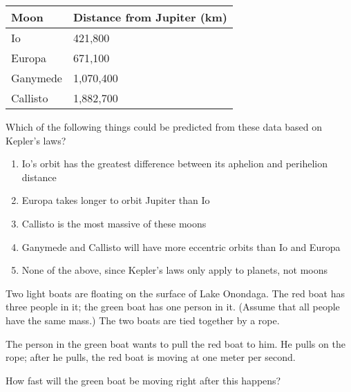 \documentclass[12pt]{article}
\def\BS{\bigskip}
\begin{document}
\begin{enumerate}
\begin{minipage}{\textwidth}
{\begin{center}
\begin{tabular}{|l|l|}
\hline
Moon  & Distance from Jupiter (km) \\ \hline
Io      & 421,800              \\ \hline
Europa  & 671,100              \\ \hline
Ganymede& 1,070,400           \\ \hline
Callisto& 1,882,700           \\ \hline
\end{tabular}
\end{center}

\bigskip

Which of the following things could be predicted from these data based on Kepler's laws?

\begin{enumerate}[label=(\Alph*)]
\setlength\itemsep{0.0em}
\item{ Io's orbit has the greatest difference between its aphelion and perihelion distance }
\item{ Europa takes longer to orbit Jupiter than Io }
\item{ Callisto is the most massive of these moons }
\item{ Ganymede and Callisto will have more eccentric orbits than Io and Europa }
\item{ None of the above, since Kepler's laws only apply to planets, not moons }
\end{enumerate}
} %
\end{minipage}


\vspace{0.5in}

\begin{minipage}{\textwidth}
\item{Two light boats are floating on the surface of Lake Onondaga. The red boat has three people in it; the green boat has one person in it.
(Assume that all people have the same mass.) The two boats are tied together by a rope.

\BS

The person in the green boat wants to pull the red boat to him. He pulls on the rope; after he pulls, the red boat is moving 
at one meter per second.

\BS

How fast will the green boat be moving right after this happens?

}
\end{minipage}
\end{enumerate}
\end{document}
